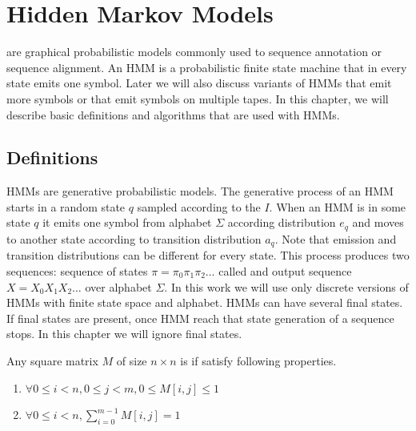 \chapter{Hidden Markov Models}
\label{CHAPTER:HMM}

 are graphical probabilistic models
commonly used to sequence annotation or sequence alignment. An HMM is
a probabilistic finite state machine that in every state emits one symbol. Later
we will also discuss variants of HMMs that emit more symbols or that emit symbols on multiple
tapes. In this chapter, we will describe basic
definitions and algorithms that are used with HMMs.

\section{Definitions}\label{SECTION:HMMDEF}
                       
HMMs are generative probabilistic models.
The generative process of an HMM starts in a random state $q$ sampled according
to the  $I$.  When an HMM is in some state $q$ it emits one symbol from
alphabet $\Sigma$ according distribution $e_q$ and moves to another state
according to transition distribution $a_q$. Note that emission and transition
distributions can be different for every state.  This process produces two
sequences: sequence of states $\pi=\pi_0\pi_1\pi_2\dots$ called
 and output sequence $X=X_0X_1X_2\dots$ over alphabet
$\Sigma$. In this work we will use only discrete versions of HMMs with finite state
space and alphabet.  HMMs can have several final states.
If final states are present, once HMM reach that state generation of a sequence
stops. In this chapter we will ignore final states. 


\begin{definition}
Any square matrix $M$ of size $n\times n$ is  if satisfy
following properties.
\begin{enumerate}
\item $\forall 0\leq i<n,0\leq j < m, 0\leq M[i,j]\leq 1$
\item $\forall 0\le i<n, \sum_{i=0}^{m-1}M[i,j]=1$
\end{enumerate}
\end{definition}

